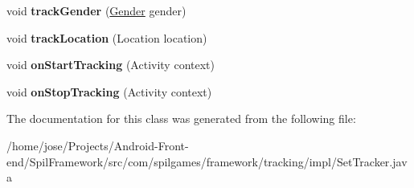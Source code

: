 \begin{DoxyCompactItemize}
\item 
\hypertarget{classcom_1_1spilgames_1_1framework_1_1tracking_1_1impl_1_1_set_tracker_a143d85ca51cda371ab507e2245173bf0}{void {\bfseries track\-Gender} (\hyperlink{enumcom_1_1spilgames_1_1framework_1_1core_1_1_gender}{Gender} gender)}\label{classcom_1_1spilgames_1_1framework_1_1tracking_1_1impl_1_1_set_tracker_a143d85ca51cda371ab507e2245173bf0}

\item 
\hypertarget{classcom_1_1spilgames_1_1framework_1_1tracking_1_1impl_1_1_set_tracker_a0b34b5091b4c6afbd55c011282dbe2e1}{void {\bfseries track\-Location} (Location location)}\label{classcom_1_1spilgames_1_1framework_1_1tracking_1_1impl_1_1_set_tracker_a0b34b5091b4c6afbd55c011282dbe2e1}

\item 
\hypertarget{classcom_1_1spilgames_1_1framework_1_1tracking_1_1impl_1_1_set_tracker_ab8f6ee8783682e5a6b63046e1735d053}{void {\bfseries on\-Start\-Tracking} (Activity context)}\label{classcom_1_1spilgames_1_1framework_1_1tracking_1_1impl_1_1_set_tracker_ab8f6ee8783682e5a6b63046e1735d053}

\item 
\hypertarget{classcom_1_1spilgames_1_1framework_1_1tracking_1_1impl_1_1_set_tracker_a609b8f0fd405f81dca81c2f589c88fe4}{void {\bfseries on\-Stop\-Tracking} (Activity context)}\label{classcom_1_1spilgames_1_1framework_1_1tracking_1_1impl_1_1_set_tracker_a609b8f0fd405f81dca81c2f589c88fe4}

\end{DoxyCompactItemize}


The documentation for this class was generated from the following file\-:\begin{DoxyCompactItemize}
\item 
/home/jose/\-Projects/\-Android-\/\-Front-\/end/\-Spil\-Framework/src/com/spilgames/framework/tracking/impl/Set\-Tracker.\-java\end{DoxyCompactItemize}
